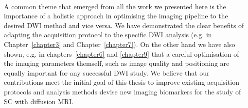 \paragraph{}
A common theme that emerged from all the work we presented here is the importance of a holistic approach in optimising the imaging pipeline to the desired \gls{DWI} method and vice versa. We have demonstrated the clear benefits of adapting the acquisition protocol to the specific \gls{DWI} analysis (e.g. in Chapter~\ref{chapter3} and Chapter~\ref{chapter7}). On the other hand we have also shown, e.g. in chapters~\ref{chapter6} and \ref{chapter9} that a careful optimisation of the imaging parameters themself, such as image quality and positioning are equally important for any successful \gls{DWI} study. We believe that our contributions meet the initial goal of this thesis to improve existing acquisition protocols and analysis methods devise new imaging biomarkers for the study of \gls{SC} with diffusion MRI.
% 
